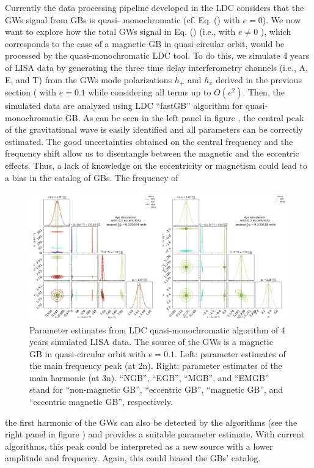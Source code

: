 \documentclass[a4paper,10.5pt]{article}
\begin{document}
Currently the data processing pipeline developed in the LDC considers that the GWs signal from GBs is quasi- monochromatic (cf. Eq. () with $e=0$). We now want to explore how the total GWs signal in Eq. () (i.e., with $e\not=0$ ), which corresponds to the case of a magnetic GB in quasi-circular orbit, would be processed by the quasi-monochromatic LDC tool. To do this, we simulate 4 years of LISA data by generating the three time delay interferometry channels (i.e., A, E, and T) from the GWs mode polarizations $h_+$ and $h_x$ derived in the previous section ( with $e=0.1$ while considering all terms up to $O(e^2)$. Then, the simulated data are analyzed using LDC “fastGB” algorithm for quasi-monochromatic GB.
As can be seen in the left panel in figure , the central peak of the gravitational wave is easily identified and all parameters can be correctly estimated. The good uncertainties obtained on the central frequency and the frequency shift allow us to disentangle between the magnetic and the eccentric effects. Thus, a lack of knowledge on the eccentricity or magnetism could lead to a bias in the catalog of GBs. The frequency of\vspace{1mm}  
\begin{figure}[H]
    \centering
    \includegraphics[scale=0.5]{Figura 2.png}
    \caption{Parameter estimates from LDC quasi-monochromatic algorithm of 4 years simulated LISA data. The source of the GWs is a magnetic GB in quasi-circular orbit with $e = 0.1$. Left: parameter estimates of the main frequency peak (at 2n). Right: parameter estimates of the main harmonic (at 3n). “NGB”, “EGB”, “MGB”, and “EMGB” stand for “non-magnetic GB”, “eccentric GB”, “magnetic GB”, and “eccentric magnetic GB”, respectively.
}
    \label{Figura 2}
\end{figure} \vspace{1mm} 
the first harmonic of the GWs can also be detected by the algorithms (see the right panel in figure ) and provides a suitable parameter estimate. With current algorithms, this peak could be interpreted as a new source with a lower amplitude and frequency. Again, this could biased the GBs’ catalog.
\thispagestyle{empty}
\end{document}
